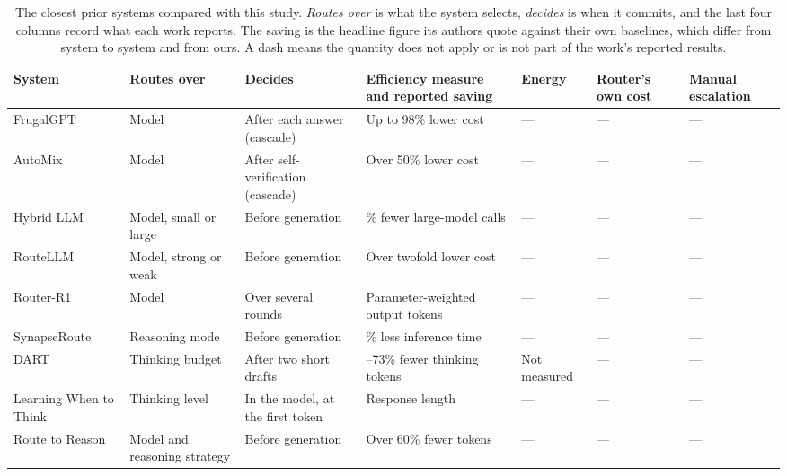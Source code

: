 \documentclass[final,5p,times,twocolumn]{elsarticle}
\theoremstyle{plain}
\begin{document}
\begin{table}[ht]
\centering
\footnotesize
\caption{The closest prior systems compared with this study. \emph{Routes
over} is what the system selects, \emph{decides} is when it commits, and the
last four columns record what each work reports. The saving is the headline
figure its authors quote against their own baselines, which differ from
system to system and from ours. A dash means the quantity does not apply or
is not part of the work's reported results.}
\label{tab:prior-work}
\renewcommand{\arraystretch}{1.15}
\setlength{\tabcolsep}{4pt}
\begin{tabularx}{\textwidth}{@{}l >{\raggedright\arraybackslash}p{2.35cm} >{\raggedright\arraybackslash}p{2.35cm} >{\raggedright\arraybackslash}X >{\raggedright\arraybackslash}p{1.85cm} >{\raggedright\arraybackslash}p{2.75cm} >{\raggedright\arraybackslash}p{1.6cm}@{}}
\toprule
System & Routes over & Decides & Efficiency measure and reported saving & Energy & Router's own cost & Manual escalation \\
\midrule
FrugalGPT \cite{chen2023frugalgpt} & Model & After each answer (cascade) & Up to 98\% lower cost & --- & --- & --- \\
AutoMix \cite{aggarwal2024automix} & Model & After self-verification (cascade) & Over 50\% lower cost & --- & --- & --- \\
Hybrid LLM \cite{ding2024hybridllm} & Model, small or large & Before generation & 40\% fewer large-model calls & --- & --- & --- \\
RouteLLM \cite{ong2024routellm} & Model, strong or weak & Before generation & Over twofold lower cost & --- & --- & --- \\
Router-R1 \cite{zhang2025routerr1} & Model & Over several rounds & Parameter-weighted output tokens & --- & --- & --- \\
SynapseRoute \cite{zhang2025synapseroute} & Reasoning mode & Before generation & 36.8\% less inference time & --- & --- & --- \\
DART \cite{lee2026dart} & Thinking budget & After two short drafts & 32--73\% fewer thinking tokens & Not measured & --- & --- \\
Learning When to Think \cite{kassenaar2026learningwhentothink} & Thinking level & In the model, at the first token & Response length & --- & --- & --- \\
Route to Reason \cite{pan2026routetoreason} & Model and reasoning strategy & Before generation & Over 60\% fewer tokens & --- & --- & --- \\

\end{tabularx}
\end{table}
\end{document}
